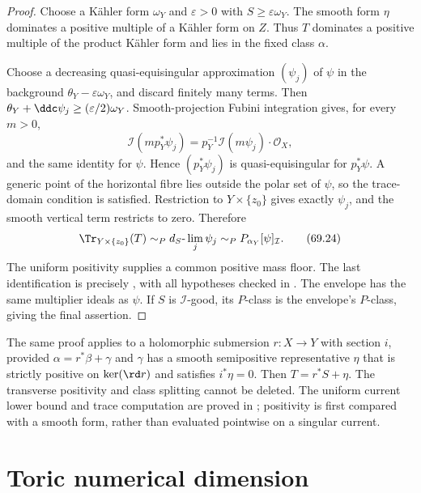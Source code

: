 \begin{proof}
Choose a K\"ahler form $\omega_Y$ and $\varepsilon>0$ with
$S\geq\varepsilon\omega_Y$. The smooth form $\eta$ dominates a
positive multiple of a K\"ahler form on $Z$. Thus $T$ dominates a
positive multiple of the product K\"ahler form and lies in the fixed
class $\alpha$.

Choose a decreasing quasi-equisingular approximation $(\psi_j)$ of $\psi$
in the background $\theta_Y-\varepsilon\omega_Y$, and discard finitely
many terms. Then $\theta_Y+\ddc\psi_j\geq(\varepsilon/2)\omega_Y$.
Smooth-projection Fubini integration gives, for every $m>0$,
\[
 \mathcal I(mp_Y^*\psi_j)
   =p_Y^{-1}\mathcal I(m\psi_j)\cdot\mathcal O_X,
\tag{69.23}\label{eq:verified-smooth-pullback-ideals}
\]
and the same identity for $\psi$. Hence $(p_Y^*\psi_j)$ is
quasi-equisingular for $p_Y^*\psi$. A generic point of the horizontal
fibre lies outside the polar set of $\psi$, so the trace-domain condition
is satisfied. Restriction to $Y\times\{z_0\}$ gives exactly $\psi_j$,
and the smooth vertical term restricts to zero. Therefore
\[
 \Tr_{Y\times\{z_0\}}(T)
       \sim_P d_S\text{-}\lim_j\psi_j
       \sim_P P_{\alpha_Y}[\psi]_{\mathcal I}.
\tag{69.24}\label{eq:verified-split-limit}
\]
The uniform positivity supplies a common positive mass floor. The last
identification is precisely \cite[Corollary~7.1.2]{XiaBook}, with all
hypotheses checked in . The envelope has the
same multiplier ideals as $\psi$. If $S$ is $\mathcal I$-good, its
$P$-class is the envelope's $P$-class, giving the final assertion.
\end{proof}

\begin{remark}
\label{rem:verified-retraction}
The same proof applies to a holomorphic submersion
$r:X\to Y$ with section $i$, provided
$\alpha=r^*\beta+\gamma$ and $\gamma$ has a smooth semipositive
representative $\eta$ that is strictly positive on $\ker(\rd r)$ and
satisfies $i^*\eta=0$. Then $T=r^*S+\eta$.
The transverse positivity and class splitting cannot be deleted.
The uniform current lower bound and trace computation are proved in
; positivity is first compared with a
smooth form, rather than evaluated pointwise on a singular current.
\end{remark}

\section{Toric numerical dimension}
\label{sec:verified-toric-dimension}

